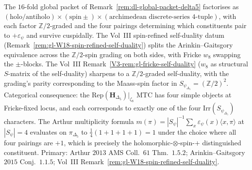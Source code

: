 \begin{remark}[$|\Psi_{\Delta_5}| = 16$ and the spin-refined Fricke grading]
\label{rem:dl-cross-volume}
The $16$-fold global packet of
Remark~\ref{rem:dl-global-packet-delta5} factorises as
$(\text{holo/antiholo}) \times (\text{spin}\pm) \times
(\text{archimedean discrete-series 4-tuple})$, with each factor
$\mathbb{Z}/2$-graded and the four pairings determining which
constituents pair to $+\varepsilon_\psi$ and survive cuspidally.
The Vol~III spin-refined self-duality datum
\textup{(}Remark~\ref{rem:gl-W18-spin-refined-self-duality}\textup{)}
splits the
Arinkin--Gaitsgory equivalence across the $\mathbb{Z}/2$-spin
grading on both sides, with Fricke $w_8$ swapping the $\pm$-blocks.
The Vol~III
Remark~\ref{V3-rem:gl-fricke-self-duality} ($w_8$ as
structural $S$-matrix of the self-duality) sharpens to a
$\mathbb{Z}/2$-graded self-duality, with the grading's parity
corresponding to the Maass-spin factor in $S_{\psi_{\Delta_5}}
= (\mathbb{Z}/2)^2$. Categorical consequence: the
$\mathrm{Rep}(\mathbf{H}_{\Delta_5})|_{\zeta_8}$ MTC has
four simple objects at Fricke-fixed locus, and each corresponds to
exactly one of the four Irr$(S_{\psi_{\Delta_5}})$ characters. The
Arthur multiplicity formula
$m(\pi) = |S_\psi|^{-1}\sum_{x}\varepsilon_\psi(x)\langle x, \pi\rangle$
at $|S_\psi| = 4$ evaluates on $\pi_{\Delta_5}$ to
$\tfrac{1}{4}(1 + 1 + 1 + 1) = 1$ under the choice where all four
pairings are $+1$, which is precisely the holomorphic-$\otimes$-spin-$+$
distinguished constituent. Primary: Arthur $2013$ AMS Coll.~$61$
Thm.~$1.5.2$; Arinkin--Gaitsgory $2015$ Conj.~$1.1.5$; Vol~III
Remark~\ref{rem:gl-W18-spin-refined-self-duality}.
\end{remark}

